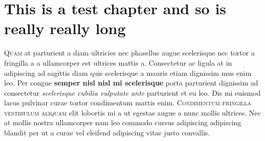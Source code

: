 

\chapter[Testing chapter]{This is a test chapter and so is really really long}

\typeout{****}
\typeout{****}

\lettrine{Q}{uam} at parturient a diam ultricies nec phasellus augue scelerisque nec tortor a fringilla a a ullamcorper est ultrices mattis a. Consectetur ac ligula at in adipiscing ad sagittis diam quis scelerisque a mauris etiam dignissim mus enim leo. Per congue \textbf{semper nisl nisl mi scelerisque} porta parturient dignissim ad consectetur \textit{scelerisque cubilia vulputate ante} parturient et eu leo. \textsf{Dis mi euismod lacus pulvinar} curae tortor condimentum mattis enim. \textsc{Condimentum fringilla vestibulum aliquam} elit lobortis mi a ut egestas augue a nunc mollis ultrices. Nec at mollis nostra ullamcorper nam leo commodo cursus adipiscing adipiscing blandit per ut a curae vel eleifend adipiscing vitae justo convallis.

